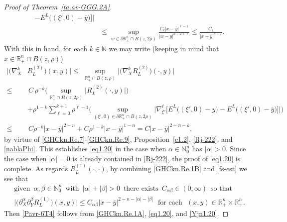 \documentclass[11pt,reqno]{amsart}
\numberwithin{equation}{section}
\theoremstyle{remark}
\begin{document}
\begin{proof}[Proof of Theorem~\ref{ta.av-GGG.2A}]
\begin{align}
-E^L\big((\xi',0)-\overline{y}\big)\big]\big|
\nonumber\\[4pt]
& \leq\sup_{w\in\partial\mathbb{R}^n_{+}\cap B(z,2\rho)}
\frac{C_\ell|x-\overline{y}|^{\ell-1}}{|w-y|^{n-2+\ell}}
\leq\frac{C_\ell}{|x-\overline{y}|^{n-1}}.
\end{align}
%
With this in hand, for each $k\in{\mathbb{N}}$ we may write 
(keeping in mind that $x\in\mathbb{R}^n_{+}\cap B(z,\rho)$)
%
\begin{align}\label{eKna-6YH}
\big|\big(\nabla_X^k & R^{(2)}_L\big)(x,y)\big|\leq 
\,\,\sup_{\mathbb{R}^n_{+}\cap B(z,\rho)}
\big|\big(\nabla_X^k R^{(2)}_L\big)(\cdot,y)\big|
\nonumber\\[4pt]
\leq & \,C\,\rho^{-k}\Big(\sup_{\mathbb{R}^n_{+}\cap B(z,2\rho)}
\big|R^{(2)}_L(\cdot,y)\big|\Big)
\nonumber\\[4pt]
& +\rho^{1-k}\sum_{\ell=0}^{k+1}\rho^{\ell-1}\Big(
\sup_{(\xi',0)\in\partial\mathbb{R}^n_{+}\cap B(z,2\rho)}
\big|\nabla^\ell_{\xi'}\big[E^L\big((\xi',0)-y\big)
-E^L\big((\xi',0)-\overline{y}\big)\big]\big|\Big)
\nonumber\\[4pt]
\leq & \,C\rho^{-k}|x-\overline{y}|^{2-n}+C\rho^{1-k}|x-\overline{y}|^{1-n}
=C|x-\overline{y}|^{2-n-k},
\end{align}
%
by virtue of \eqref{GHCkn.Re.7}-\eqref{GHCkn.Re.9}, Proposition~\ref{c1.2}, 
\eqref{Rj-222}, and \eqref{nablaPhi}. This establishes \eqref{eq1.20} in the case when 
$\alpha\in{\mathbb{N}}_0^n$ has $|\alpha|>0$. Since the case when $|\alpha|=0$ is already 
contained in \eqref{Rj-222}, the proof of \eqref{eq1.20} is complete. 
As regards $R^{(1)}_L(\cdot,\cdot)$, by combining \eqref{GHCkn.Re.1B} 
and \eqref{fs-est} we see that
%
\begin{equation}\label{Yjn1.20}
\begin{array}{c}
\text{given }\,\alpha,\beta\in\mathbb{N}_0^n\,\text{ with }\,
|\alpha|+|\beta|>0\,\text{ there exists }\,C_{\alpha\beta}\in(0,\infty)\,\text{ so that}
\\[4pt]
\big|\big(\partial^\alpha_X\partial^\beta_Y R^{(1)}_L\big)(x,y)\big|
\leq C_{\alpha\beta}|x-\overline{y}|^{2-n-|\alpha|-|\beta|}\,\,\text{ for each }\,\,
(x,y)\in{\mathbb{R}}^n_{+}\times{\mathbb{R}}^n_{+}.
\end{array}
\end{equation}
%
Then \eqref{Pavr-6T4} follows from \eqref{GHCkn.Re.1A}, \eqref{eq1.20}, and
\eqref{Yjn1.20}. 



\end{proof}
\end{document}
